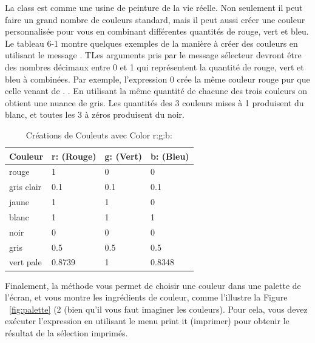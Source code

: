 \documentclass[a4paper,10pt,twoside]{book}
\begin{document}
La class  est comme une usine de peinture de la vie r\'eelle. Non seulement il peut faire 
un grand nombre de couleurs standard, mais il peut aussi cr\'eer une couleur personnalis\'ee pour vous 
en combinant diff\'erentes quantit\'es de rouge, vert et bleu. Le tableau 6-1 montre quelques exemples 
de la mani\`ere \`a cr\'eer des couleurs en utilisant le message . 
TLes arguments pris par le message s\'electeur  devront \^etre des nombres d\'ecimaux entre 0 
et 1 qui repr\'esentent la quantit\'e de rouge, vert et bleu \`a combin\'ees. Par exemple, l'expression 
 0 cr\'ee la m\^eme couleur rouge pur que celle venant de . 
. En utilisant la m\^eme quantit\'e de chacune des trois couleurs on obtient une nuance de gris. Les 
quantit\'es des 3 couleurs mises \`a 1 produisent du blanc, et toutes les 3 \`a z\'eros produisent du noir.

\noindent
\begin{table}[h!]
\caption{Cr\'eations de Couleuts avec  \textsf{\upshape Color r:g:b:}}
\label{tab0601}
\begin{center}
{\small \begin{tabular}{p{20mm}p{20mm}p{20mm}p{20mm}}
\hline
{\small \textbf{Couleur}} & {\small \textbf{r: (Rouge)}} & {\small \textbf{g: (Vert)}} & {\small \textbf{b: (Bleu)}}\\
\hline
{\small rouge} & {\small 1} & {\small 0} & {\small 0}\\
{\small gris clair} & {\small 0.1} & {\small 0.1} & {\small 0.1}\\
{\small jaune} & {\small 1} & {\small 1} & {\small 0}\\
{\small blanc} & {\small 1} & {\small 1} & {\small 1}\\
{\small noir} & {\small 0} & {\small 0} & {\small 0}\\
{\small gris} & {\small 0.5} & {\small 0.5} & {\small 0.5}\\
{\small vert pale} & {\small 0.8739} & {\small 1} & {\small 0.8348}\\
\hline
\end{tabular}}
\end{center}
\end{table}

Finalement, la m\'ethode  vous permet de choisir une couleur dans une palette de l'\'ecran, 
et vous montre les ingr\'edients de couleur, comme l'illustre la Figure ~\ref{fig:palette} (2 (bien 
qu'il vous faut imaginer les couleurs). Pour cela, vous devez ex\'ecuter l'expression  
en utilisant le menu print it (imprimer) pour obtenir le r\'esultat de la s\'election imprim\'es.
\end{document}
